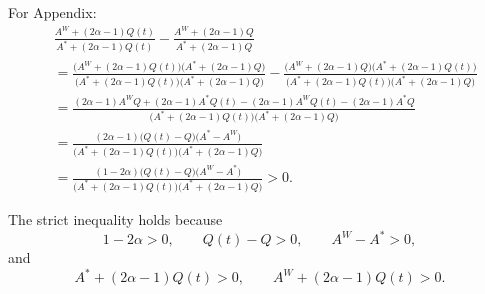 \documentclass[11pt]{article}
\begin{document}
For Appendix: 
\begin{equation} \label{app:ratio-calculation}
\begin{aligned}
&
\frac{A^W+(2\alpha-1)Q(t)}
     {A^*+(2\alpha-1)Q(t)}
-
\frac{A^W+(2\alpha-1)Q}
     {A^*+(2\alpha-1)Q}
\\[1mm]
&=
\frac{
\bigl(A^W+(2\alpha-1)Q(t)\bigr)
\bigl(A^*+(2\alpha-1)Q\bigr)}
{\bigl(A^*+(2\alpha-1)Q(t)\bigr)
 \bigl(A^*+(2\alpha-1)Q\bigr)}
-
\frac{
\bigl(A^W+(2\alpha-1)Q\bigr)
\bigl(A^*+(2\alpha-1)Q(t)\bigr)}
{\bigl(A^*+(2\alpha-1)Q(t)\bigr)
 \bigl(A^*+(2\alpha-1)Q\bigr)}
\\[1mm]
&=
\frac{
(2\alpha-1)A^WQ
+(2\alpha-1)A^*Q(t)
-(2\alpha-1)A^WQ(t)
-(2\alpha-1)A^*Q}
{\bigl(A^*+(2\alpha-1)Q(t)\bigr)
 \bigl(A^*+(2\alpha-1)Q\bigr)}
\\[1mm]
&=
\frac{
(2\alpha-1)
\bigl(Q(t)-Q\bigr)
\bigl(A^*-A^W\bigr)}
{\bigl(A^*+(2\alpha-1)Q(t)\bigr)
 \bigl(A^*+(2\alpha-1)Q\bigr)}
\\[1mm]
&=
\frac{
(1-2\alpha)
\bigl(Q(t)-Q\bigr)
\bigl(A^W-A^*\bigr)}
{\bigl(A^*+(2\alpha-1)Q(t)\bigr)
 \bigl(A^*+(2\alpha-1)Q\bigr)} > 0.
\end{aligned}
\end{equation}

The strict inequality holds because
\[
1-2\alpha>0,\qquad
Q(t)-Q>0,\qquad
A^W-A^*>0,
\]
and
\[
A^*+(2\alpha-1)Q(t)>0,
\qquad
A^W+(2\alpha-1)Q(t)>0.
\]
\end{document}
